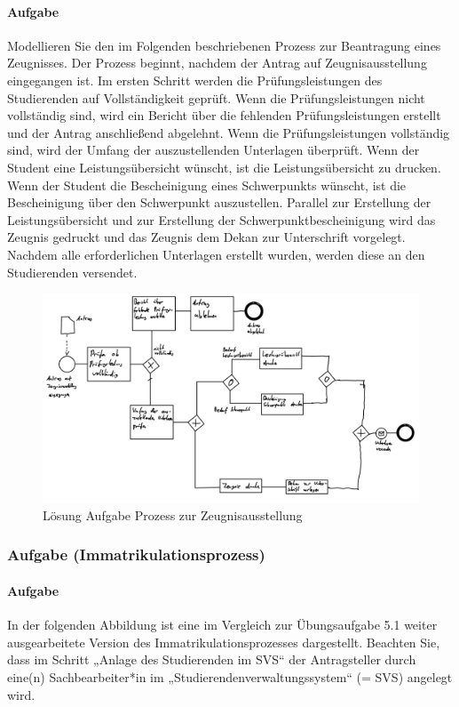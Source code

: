     \paragraph*{Aufgabe}
        Modellieren Sie den im Folgenden beschriebenen Prozess zur Beantragung eines Zeugnisses. Der Prozess beginnt, nachdem der Antrag auf Zeugnisausstellung eingegangen ist. Im ersten Schritt werden die Prüfungsleistungen des Studierenden auf Vollständigkeit geprüft. Wenn
        die Prüfungsleistungen nicht vollständig sind, wird ein Bericht über die fehlenden Prüfungsleistungen erstellt und der Antrag anschließend abgelehnt. Wenn die Prüfungsleistungen vollständig sind, wird der Umfang der auszustellenden Unterlagen überprüft. Wenn der Student eine Leistungsübersicht wünscht, ist die Leistungsübersicht zu drucken. Wenn der Student die Bescheinigung eines Schwerpunkts wünscht, ist die Bescheinigung über den Schwerpunkt auszustellen. Parallel zur Erstellung
        der Leistungsübersicht und zur Erstellung der Schwerpunktbescheinigung wird das Zeugnis gedruckt und das Zeugnis dem Dekan zur Unterschrift vorgelegt. Nachdem alle erforderlichen Unterlagen erstellt wurden, werden diese an den Studierenden versendet.
        \begin{figure}[h]
            \centering
            \includegraphics[width=\textwidth]{image/Loesung_Aufgabe_Prozess_zur_Zeugnissaustellung.png}
            \caption{Lösung Aufgabe Prozess zur Zeugnisausstellung}
            \label{fig:Loesung_Aufgabe_Prozess_zur_Zeugnissaustellung}
        \end{figure}

\subsubsection*{Aufgabe (Immatrikulationsprozess)}
    \paragraph*{Aufgabe}
        In der folgenden Abbildung ist eine im Vergleich zur Übungsaufgabe 5.1 weiter ausgearbeitete Version des Immatrikulationsprozesses dargestellt. Beachten Sie, dass im Schritt „Anlage des Studierenden im SVS“ der Antragsteller durch eine(n) Sachbearbeiter*in im „Studierendenverwaltungssystem“ (= SVS) angelegt wird.

